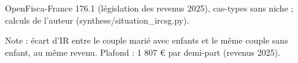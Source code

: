 OpenFisca-France 176.1 (législation des revenus 2025), cas-types sans niche ; calculs de l'auteur (synthese/situation\_ircsg.py).\par Note : écart d'IR entre le couple marié avec enfants et le même couple sans enfant, au même revenu. Plafond : 1 807 \euro{} par demi-part (revenus 2025).
